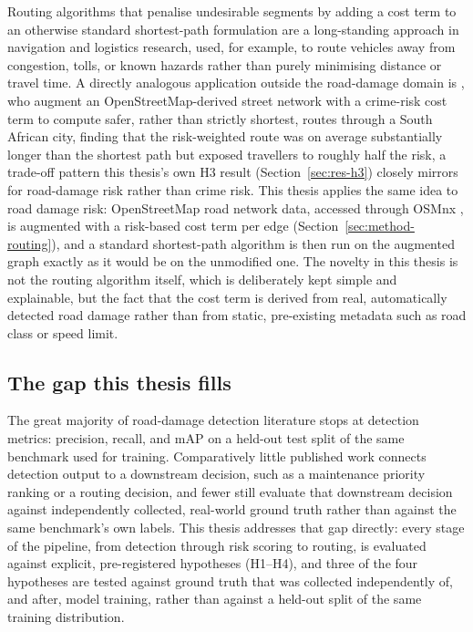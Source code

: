 \documentclass[10pt,a4paper,twocolumn]{article}
\begin{document}
Routing algorithms that penalise undesirable segments by adding a cost
term to an otherwise standard shortest-path formulation are a
long-standing approach in navigation and logistics research, used, for
example, to route vehicles away from congestion, tolls, or known hazards
rather than purely minimising distance or travel time. A directly
analogous application outside the road-damage domain is
\citet{purchase2026saferoute}, who augment an OpenStreetMap-derived
street network with a crime-risk cost term to compute safer, rather
than strictly shortest, routes through a South African city, finding
that the risk-weighted route was on average substantially longer than
the shortest path but exposed travellers to roughly half the risk,
a trade-off pattern this thesis's own H3 result
(Section~\ref{sec:res-h3}) closely mirrors for road-damage risk rather
than crime risk. This thesis applies the same idea to
road damage risk: OpenStreetMap road network data, accessed through
OSMnx \citep{boeing2017osmnx}, is augmented with a risk-based cost term
per edge (Section~\ref{sec:method-routing}), and a standard shortest-path
algorithm is then run on the augmented graph exactly as it would be on
the unmodified one. The novelty in this thesis is not the routing
algorithm itself, which is deliberately kept simple and explainable, but
the fact that the cost term is derived from real, automatically detected
road damage rather than from static, pre-existing metadata such as road
class or speed limit.

\subsection{The gap this thesis fills}
\label{sec:rw-gap}

The great majority of road-damage detection literature stops at
detection metrics: precision, recall, and mAP on a held-out test split of
the same benchmark used for training. Comparatively little published work
connects detection output to a downstream decision, such as a
maintenance priority ranking or a routing decision, and fewer still
evaluate that downstream decision against independently collected,
real-world ground truth rather than against the same benchmark's own
labels. This thesis addresses that gap directly: every stage of the
pipeline, from detection through risk scoring to routing, is evaluated
against explicit, pre-registered hypotheses (H1--H4), and three of the
four hypotheses are tested against ground truth that was collected
independently of, and after, model training, rather than against a
held-out split of the same training distribution.
\end{document}

